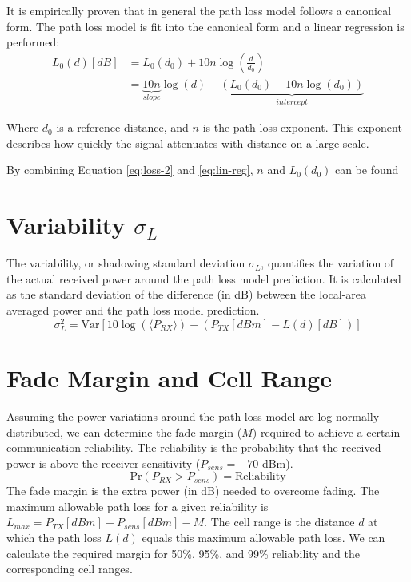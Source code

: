 It is empirically proven that in general the path loss model follows a canonical form. The path loss model is fit into the canonical form and a linear regression is performed:
\begin{align}
	L_0(d) [dB] &= L_0(d_0) + 10n \log\left(\frac{d}{d_0}\right)\\
				&= \underbrace{10n}_{slope} \log(d) + \underbrace{(L_0(d_0) - 10n \log(d_0))}_{intercept} \label{eq:lin-reg}
\end{align}


Where $d_0$ is a reference distance, and $n$ is the path loss exponent. This exponent describes how quickly the signal attenuates with distance on a large scale.

By combining Equation \eqref{eq:loss-2} and \eqref{eq:lin-reg}, $n$ and $L_0(d_0)$ can be found

\section{Variability $\sigma_L$}
The variability, or shadowing standard deviation $\sigma_L$, quantifies the variation of the actual received power around the path loss model prediction. It is calculated as the standard deviation of the difference (in dB) between the local-area averaged power and the path loss model prediction.
\begin{equation}
	\sigma_L^2 = \text{Var} \left[ 10\log(\langle P_{RX} \rangle) - (P_{TX}[dBm] - L(d)[dB]) \right]
\end{equation}

\section{Fade Margin and Cell Range}
Assuming the power variations around the path loss model are log-normally distributed, we can determine the fade margin ($M$) required to achieve a certain communication reliability. The reliability is the probability that the received power is above the receiver sensitivity ($P_{sens} = -70$ dBm).
\begin{equation}
	\text{Pr}(P_{RX} > P_{sens}) = \text{Reliability}
\end{equation}
The fade margin is the extra power (in dB) needed to overcome fading. The maximum allowable path loss for a given reliability is $L_{max} = P_{TX}[dBm] - P_{sens}[dBm] - M$. The cell range is the distance $d$ at which the path loss $L(d)$ equals this maximum allowable path loss. We can calculate the required margin for 50\%, 95\%, and 99\% reliability and the corresponding cell ranges.

